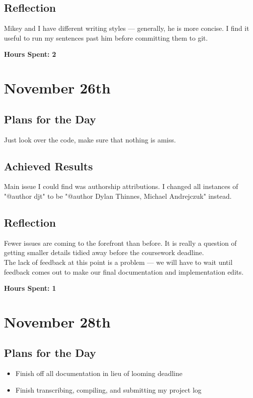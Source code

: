 \documentclass[titlepage, 12pt]{extarticle}
\begin{document}
\subsection{Reflection}
Mikey and I have different writing styles --- generally, he is more concise. I
find it useful to run my sentences past him before committing them to git.

{\bf Hours Spent: 2 }
\section{November 26th}
\subsection{Plans for the Day}
Just look over the code, make sure that nothing is amiss.

\subsection{Achieved Results}
Main issue I could find was authorship attributions. I changed all instances of
"@author djt" to be "@author Dylan Thinnes, Michael Andrejczuk" instead.

\subsection{Reflection}
Fewer issues are coming to the forefront than before. It is really a question
of getting smaller details tidied away before the coursework deadline.\\

The lack of feedback at this point is a problem --- we will have to wait until
feedback comes out to make our final documentation and implementation edits.

{\bf Hours Spent: 1 }

\section{November 28th}
\subsection{Plans for the Day}
\begin{itemize}
    \item Finish off all documentation in lieu of looming deadline
    \item Finish transcribing, compiling, and submitting my project log
\end{itemize}
\end{document}

